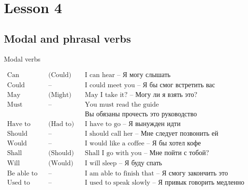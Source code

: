 \documentclass{tstextbook}
\begin{document}
	
	
	\chapter{Lesson 4}
	
	\section{Modal and phrasal verbs}

	\begin{theorem} Modal verbs
	\label{th: Modal_verbs}
	
		\begin{align*}
			\text{Can} && \text{(Could)} && \text{I can hear -- Я могу слышать} \\
			\text{Could} && \text{--} && \text{I could meet you -- Я бы смог встретить вас} \\
			\text{May} && \text{(Might)} && \text{May I take it? -- Могу ли я взять это?} \\
			\text{Must} && \text{--} && \text{You must read the guide} \\
			\text{} && \text{} && \text{Вы обязаны прочесть это руководство} \\
			\text{Have to} && \text{(Had to)} && \text{I have to go -- Я вынужден идти} \\
			\text{Should} && \text{--} && \text{I should call her -- Мне следует позвонить ей} \\
			\text{Would} && \text{--} && \text{I would like a coffee -- Я бы хотел кофе} \\
			\text{Shall} && \text{(Should)} && \text{Shall I go with you -- Мне пойти с тобой?} \\
			\text{Will} && \text{(Would)} && \text{I will sleep -- Я буду спать} \\
			\text{Be able to} && \text{--} && \text{I am able to finish that -- Я смогу закончить это} \\
			\text{Used to} && \text{--} && \text{I used to speak slowly -- Я привык говорить медленно}
		\end{align*}
	\end{theorem}

\newpage
\end{document}

